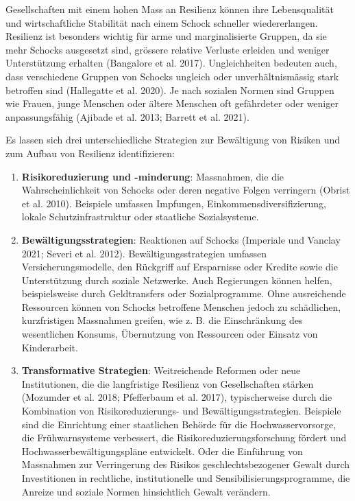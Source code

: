 \documentclass[
  nswissgerman,
  a4paper,
  DIV=11,
  numbers=noendperiod,
  oneside,
  openany]{scrreprt}
\begin{document}
Gesellschaften mit einem hohen Mass an Resilienz können ihre
Lebensqualität und wirtschaftliche Stabilität nach einem Schock
schneller wiedererlangen. Resilienz ist besonders wichtig für arme und
marginalisierte Gruppen, da sie mehr Schocks ausgesetzt sind, grössere
relative Verluste erleiden und weniger Unterstützung erhalten (Bangalore
et al. 2017). Ungleichheiten bedeuten auch, dass verschiedene Gruppen
von Schocks ungleich oder unverhältnismässig stark betroffen sind
(Hallegatte et al. 2020). Je nach sozialen Normen sind Gruppen wie
Frauen, junge Menschen oder ältere Menschen oft gefährdeter oder weniger
anpassungsfähig (Ajibade et al. 2013; Barrett et al. 2021).

Es lassen sich drei unterschiedliche Strategien zur Bewältigung von
Risiken und zum Aufbau von Resilienz identifizieren:

\begin{enumerate}
\def\labelenumi{\arabic{enumi}.}
\item
  \textbf{Risikoreduzierung und -minderung}: Massnahmen, die die
  Wahrscheinlichkeit von Schocks oder deren negative Folgen verringern
  (Obrist et al. 2010). Beispiele umfassen Impfungen,
  Einkommensdiversifizierung, lokale Schutzinfrastruktur oder staatliche
  Sozialsysteme.
\item
  \textbf{Bewältigungsstrategien}: Reaktionen auf Schocks (Imperiale und
  Vanclay 2021; Severi et al. 2012). Bewältigungsstrategien umfassen
  Versicherungsmodelle, den Rückgriff auf Ersparnisse oder Kredite sowie
  die Unterstützung durch soziale Netzwerke. Auch Regierungen können
  helfen, beispielsweise durch Geldtransfers oder Sozialprogramme. Ohne
  ausreichende Ressourcen können von Schocks betroffene Menschen jedoch
  zu schädlichen, kurzfristigen Massnahmen greifen, wie z. B. die
  Einschränkung des wesentlichen Konsums, Übernutzung von Ressourcen
  oder Einsatz von Kinderarbeit.
\item
  \textbf{Transformative Strategien}: Weitreichende Reformen oder neue
  Institutionen, die die langfristige Resilienz von Gesellschaften
  stärken (Mozumder et al. 2018; Pfefferbaum et al. 2017),
  typischerweise durch die Kombination von Risikoreduzierungs- und
  Bewältigungsstrategien. Beispiele sind die Einrichtung einer
  staatlichen Behörde für die Hochwasservorsorge, die Frühwarnsysteme
  verbessert, die Risikoreduzierungsforschung fördert und
  Hochwasserbewältigungspläne entwickelt. Oder die Einführung von
  Massnahmen zur Verringerung des Risikos geschlechtsbezogener Gewalt
  durch Investitionen in rechtliche, institutionelle und
  Sensibilisierungsprogramme, die Anreize und soziale Normen
  hinsichtlich Gewalt verändern.
\end{enumerate}
\end{document}
